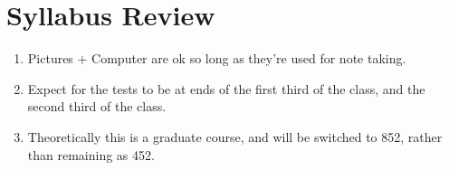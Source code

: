 \section{Syllabus Review}
    \begin{enumerate}
        \item Pictures + Computer are ok so long as they're used for note taking.
        \item Expect for the tests to be at ends of the first third of the class, and the second third of the class.
        \item Theoretically this is a graduate course, and will be switched to 852, rather than remaining as 452.
    \end{enumerate}

